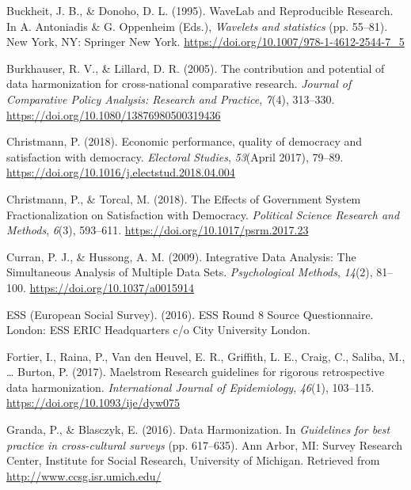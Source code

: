 \documentclass[12pt,]{article}
\begin{document}
\leavevmode\hypertarget{ref-Buckheit1995}{}%
Buckheit, J. B., \& Donoho, D. L. (1995). WaveLab and Reproducible Research. In A. Antoniadis \& G. Oppenheim (Eds.), \emph{Wavelets and statistics} (pp. 55--81). New York, NY: Springer New York. \url{https://doi.org/10.1007/978-1-4612-2544-7_5}

\leavevmode\hypertarget{ref-Burkhauser2005}{}%
Burkhauser, R. V., \& Lillard, D. R. (2005). The contribution and potential of data harmonization for cross-national comparative research. \emph{Journal of Comparative Policy Analysis: Research and Practice}, \emph{7}(4), 313--330. \url{https://doi.org/10.1080/13876980500319436}

\leavevmode\hypertarget{ref-Christmann2018}{}%
Christmann, P. (2018). Economic performance, quality of democracy and satisfaction with democracy. \emph{Electoral Studies}, \emph{53}(April 2017), 79--89. \url{https://doi.org/10.1016/j.electstud.2018.04.004}

\leavevmode\hypertarget{ref-Christmann2018a}{}%
Christmann, P., \& Torcal, M. (2018). The Effects of Government System Fractionalization on Satisfaction with Democracy. \emph{Political Science Research and Methods}, \emph{6}(3), 593--611. \url{https://doi.org/10.1017/psrm.2017.23}

\leavevmode\hypertarget{ref-Curran2009}{}%
Curran, P. J., \& Hussong, A. M. (2009). Integrative Data Analysis: The Simultaneous Analysis of Multiple Data Sets. \emph{Psychological Methods}, \emph{14}(2), 81--100. \url{https://doi.org/10.1037/a0015914}

\leavevmode\hypertarget{ref-ESSEuropeanSocialSurvey2016b}{}%
ESS (European Social Survey). (2016). ESS Round 8 Source Questionnaire. London: ESS ERIC Headquarters c/o City University London.

\leavevmode\hypertarget{ref-Fortier2017a}{}%
Fortier, I., Raina, P., Van den Heuvel, E. R., Griffith, L. E., Craig, C., Saliba, M., \ldots{} Burton, P. (2017). Maelstrom Research guidelines for rigorous retrospective data harmonization. \emph{International Journal of Epidemiology}, \emph{46}(1), 103--115. \url{https://doi.org/10.1093/ije/dyw075}

\leavevmode\hypertarget{ref-Granda2016}{}%
Granda, P., \& Blasczyk, E. (2016). Data Harmonization. In \emph{Guidelines for best practice in cross-cultural surveys} (pp. 617--635). Ann Arbor, MI: Survey Research Center, Institute for Social Research, University of Michigan. Retrieved from \url{http://www.ccsg.isr.umich.edu/}
\end{document}
